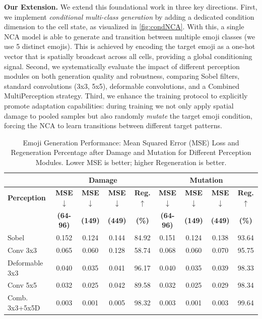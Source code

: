 \documentclass[10pt]{article} %
\begin{document}
\noindent\textbf{Our Extension.}
We extend this foundational work in three key directions. First, we implement \textit{conditional multi-class generation} by adding a dedicated condition dimension to the cell state, as visualized in \cref{fig:condNCA}. With this, a single NCA model is able to generate and transition between multiple emoji classes (we use 5 distinct emojis). This is achieved by encoding the target emoji as a one-hot vector that is spatially broadcast across all cells, providing a global conditioning signal. Second, we systematically evaluate the impact of different perception modules on both generation quality and robustness, comparing Sobel filters, standard convolutions (3x3, 5x5), deformable convolutions, and a Combined MultiPerception strategy. Third, we enhance the training protocol to explicitly promote adaptation capabilities: during training we not only apply spatial damage to pooled samples but also randomly \textit{mutate} the target emoji condition, forcing the NCA to learn transitions between different target patterns.

\begin{table}[htbp] 
\centering
\caption{Emoji Generation Performance: Mean Squared Error (MSE) Loss and Regeneration Percentage after Damage and Mutation for Different Perception Modules. Lower MSE is better; higher Regeneration is better.}
\label{tab:emoji_combined}
\begin{tabular}{lcccc|cccc}
\hline
& \multicolumn{4}{c}{\textbf{Damage}} & \multicolumn{4}{c}{\textbf{Mutation}} \\
\hline
\textbf{Perception} & \textbf{MSE} $\downarrow$ & \textbf{MSE} $\downarrow$ & \textbf{MSE} $\downarrow$ & \textbf{Reg.} $\uparrow$ & \textbf{MSE} $\downarrow$ & \textbf{MSE} $\downarrow$ & \textbf{MSE} $\downarrow$ & \textbf{Reg.} $\uparrow$ \\
& \textbf{(64-96)} & \textbf{(149)} & \textbf{(449)} & \textbf{(\%)} & \textbf{(64-96)} & \textbf{(149)} & \textbf{(449)} & \textbf{(\%)} \\
\hline
Sobel                 & 0.152 & 0.124 & 0.144 & 84.92 & 0.151 & 0.124 & 0.138 & 93.64 \\
Conv 3x3              & 0.065 & 0.060 & 0.128 & 58.74 & 0.068 & 0.060 & 0.070 & 95.75 \\
Deformable 3x3        & 0.040 & 0.035 & 0.041 & 96.17 & 0.040 & 0.035 & 0.039 & 98.33 \\
Conv 5x5              & 0.032 & 0.025 & 0.042 & 89.58 & 0.032 & 0.025 & 0.029 & 98.34 \\
Comb. 3x3+5x5D       & 0.003 & 0.001 & 0.005 & 98.32 & 0.003 & 0.001 & 0.003 & 99.64 \\ 
\hline
\end{tabular}
\end{table}
\end{document}
